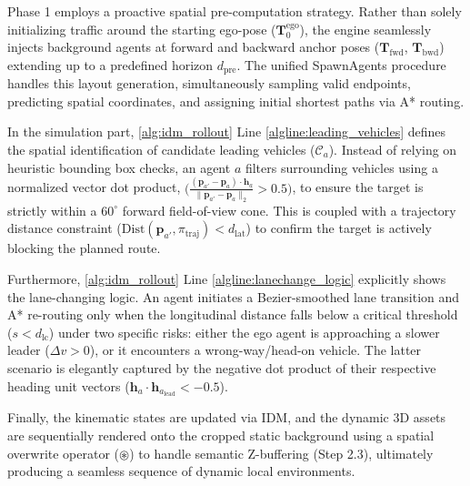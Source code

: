 Phase 1 employs a proactive spatial pre-computation strategy. Rather than solely initializing traffic around the starting ego-pose ($\mathbf{T}_0^{\text{ego}}$), the engine seamlessly injects background agents at forward and backward anchor poses ($\mathbf{T}_{\text{fwd}}$, $\mathbf{T}_{\text{bwd}}$) extending up to a predefined horizon $d_{\text{pre}}$. The unified SpawnAgents procedure handles this layout generation, simultaneously sampling valid endpoints, predicting spatial coordinates, and assigning initial shortest paths via A* routing.

In the simulation part, \cref{alg:idm_rollout} Line \ref{algline:leading_vehicles}
defines the spatial identification of candidate leading vehicles ($\mathcal{C}_a$). Instead of relying on heuristic bounding box checks, an agent $a$ filters surrounding vehicles using a normalized vector dot product, $\bigg(\frac{(\mathbf{p}_{a'} - \mathbf{p}_a) \cdot \mathbf{h}_a}{\|\mathbf{p}_{a'} - \mathbf{p}_a\|_2} > 0.5\bigg)$, to ensure the target is strictly within a $60^\circ$ forward field-of-view cone. This is coupled with a trajectory distance constraint ($\text{Dist}(\mathbf{p}_{a'}, \pi_{\text{traj}}) < d_{\text{lat}}$) to confirm the target is actively blocking the planned route.

Furthermore, \cref{alg:idm_rollout} Line \ref{algline:lanechange_logic}
explicitly shows the lane-changing logic. An agent initiates a Bezier-smoothed lane transition and A* re-routing only when the longitudinal distance falls below a critical threshold ($s < d_{\text{lc}}$) under two specific risks: either the ego agent is approaching a slower leader ($\Delta v > 0$), or it encounters a wrong-way/head-on vehicle. The latter scenario is elegantly captured by the negative dot product of their respective heading unit vectors ($\mathbf{h}_a \cdot \mathbf{h}_{a_{\text{lead}}} < -0.5$).

Finally, the kinematic states are updated via IDM, and the dynamic 3D assets are sequentially rendered onto the cropped static background using a spatial overwrite operator ($\circledast$) to handle semantic Z-buffering (Step 2.3), ultimately producing a seamless sequence of dynamic local environments.


